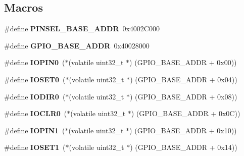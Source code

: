 \subsection*{Macros}
\begin{DoxyCompactItemize}
\item 
\mbox{\label{group__lpc24xx__regs_ga268889045f30d5285d20a97336e72ee6}} 
\#define {\bfseries P\+I\+N\+S\+E\+L\+\_\+\+B\+A\+S\+E\+\_\+\+A\+D\+DR}~0x4002\+C000
\item 
\mbox{\label{group__lpc24xx__regs_ga45d36b41a075f38c101d52a2224aede5}} 
\#define {\bfseries G\+P\+I\+O\+\_\+\+B\+A\+S\+E\+\_\+\+A\+D\+DR}~0x40028000
\item 
\mbox{\label{group__lpc24xx__regs_ga38dd0b36089ddc91a9a8d160a14deef0}} 
\#define {\bfseries I\+O\+P\+I\+N0}~($\ast$(volatile uint32\+\_\+t $\ast$) (G\+P\+I\+O\+\_\+\+B\+A\+S\+E\+\_\+\+A\+D\+DR + 0x00))
\item 
\mbox{\label{group__lpc24xx__regs_ga79680f9f3b6f1f765ceb5849fe3e520d}} 
\#define {\bfseries I\+O\+S\+E\+T0}~($\ast$(volatile uint32\+\_\+t $\ast$) (G\+P\+I\+O\+\_\+\+B\+A\+S\+E\+\_\+\+A\+D\+DR + 0x04))
\item 
\mbox{\label{group__lpc24xx__regs_ga70f12b6d0574a6a3d095821f4d73de9d}} 
\#define {\bfseries I\+O\+D\+I\+R0}~($\ast$(volatile uint32\+\_\+t $\ast$) (G\+P\+I\+O\+\_\+\+B\+A\+S\+E\+\_\+\+A\+D\+DR + 0x08))
\item 
\mbox{\label{group__lpc24xx__regs_ga8e6cb3bf6e92bcdbc07735e17e072cf2}} 
\#define {\bfseries I\+O\+C\+L\+R0}~($\ast$(volatile uint32\+\_\+t $\ast$) (G\+P\+I\+O\+\_\+\+B\+A\+S\+E\+\_\+\+A\+D\+DR + 0x0\+C))
\item 
\mbox{\label{group__lpc24xx__regs_gaee913e602697110f987df4de4d0df5f8}} 
\#define {\bfseries I\+O\+P\+I\+N1}~($\ast$(volatile uint32\+\_\+t $\ast$) (G\+P\+I\+O\+\_\+\+B\+A\+S\+E\+\_\+\+A\+D\+DR + 0x10))
\item 
\mbox{\label{group__lpc24xx__regs_ga099509e8cdef2dd5640479b951473b0a}} 
\#define {\bfseries I\+O\+S\+E\+T1}~($\ast$(volatile uint32\+\_\+t $\ast$) (G\+P\+I\+O\+\_\+\+B\+A\+S\+E\+\_\+\+A\+D\+DR + 0x14))

\end{DoxyCompactItemize}
